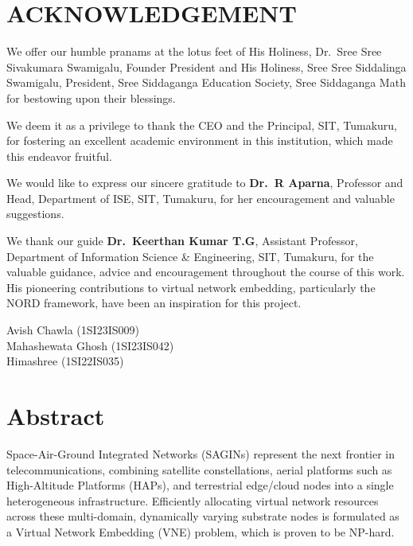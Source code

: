 \documentclass[12pt,a4paper]{report}
\begin{document}
\chapter*{ACKNOWLEDGEMENT}
\thispagestyle{fancy}

We offer our humble pranams at the lotus feet of His Holiness, Dr.\ Sree Sree Sivakumara
Swamigalu, Founder President and His Holiness, Sree Sree Siddalinga Swamigalu, President,
Sree Siddaganga Education Society, Sree Siddaganga Math for bestowing upon their blessings.

We deem it as a privilege to thank the CEO and the Principal, SIT, Tumakuru, for fostering
an excellent academic environment in this institution, which made this endeavor fruitful.

We would like to express our sincere gratitude to \textbf{Dr.\ R Aparna}, Professor and Head,
Department of ISE, SIT, Tumakuru, for her encouragement and valuable suggestions.

We thank our guide \textbf{Dr.\ Keerthan Kumar T.G}, Assistant Professor, Department of
Information Science \& Engineering, SIT, Tumakuru, for the valuable guidance, advice and
encouragement throughout the course of this work. His pioneering contributions to virtual
network embedding, particularly the NORD framework, have been an inspiration for this project.

\vspace{20pt}
\noindent
Avish Chawla (1SI23IS009)\\
Mahashewata Ghosh (1SI23IS042)\\
Himashree (1SI22IS035)

\chapter*{Abstract}
\thispagestyle{fancy}

Space-Air-Ground Integrated Networks (SAGINs) represent the next frontier in
telecommunications, combining satellite constellations, aerial platforms such as High-Altitude
Platforms (HAPs), and terrestrial edge/cloud nodes into a single heterogeneous infrastructure.
Efficiently allocating virtual network resources across these multi-domain, dynamically varying
substrate nodes is formulated as a Virtual Network Embedding (VNE) problem, which is proven
to be NP-hard.
\end{document}
